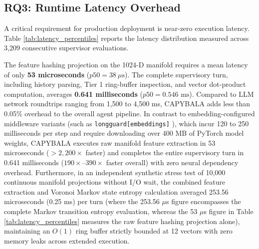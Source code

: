 \documentclass[journal]{IEEEtran}
\begin{document}
\subsection{RQ3: Runtime Latency Overhead}

A critical requirement for production deployment is near-zero execution latency. Table \ref{tab:latency_percentiles} reports the latency distribution measured across 3,209 consecutive supervisor evaluations.

\begin{table}[!t]
\caption{Execution Latency Percentiles of CAPYBALA Supervisor Across 3,209 Benchmark Execution Turns}
\label{tab:latency_percentiles}
\centering
{}
\end{table}

The feature hashing projection on the 1024-D manifold requires a mean latency of only \textbf{53 microseconds} ($p50 = 38\ \mu\text{s}$). The complete supervisory turn, including history parsing, Tier 1 ring-buffer inspection, and vector dot-product computation, averages \textbf{0.641 milliseconds} ($p50 = 0.546\text{ ms}$). Compared to LLM network roundtrips ranging from 1,500 to 4,500 ms, CAPYBALA adds less than 0.05\% overhead to the overall agent pipeline. In contrast to embedding-configured middleware variants (such as \texttt{longguard[embeddings]} \cite{longguard2024}), which incur 120 to 250 milliseconds per step and require downloading over 400 MB of PyTorch model weights, CAPYBALA executes raw manifold feature extraction in 53 microseconds ($> 2,200\times$ faster) and completes the entire supervisory turn in 0.641 milliseconds ($190\times\text{--}390\times$ faster overall) with zero neural dependency overhead. Furthermore, in an independent synthetic stress test of 10,000 continuous manifold projections without I/O wait, the combined feature extraction and Voronoi Markov state entropy calculation averaged 253.56 microseconds (0.25 ms) per turn (where the 253.56 $\mu$s figure encompasses the complete Markov transition entropy evaluation, whereas the 53 $\mu$s figure in Table \ref{tab:latency_percentiles} measures the raw feature hashing projection alone), maintaining an $O(1)$ ring buffer strictly bounded at 12 vectors with zero memory leaks across extended execution.
\end{document}
